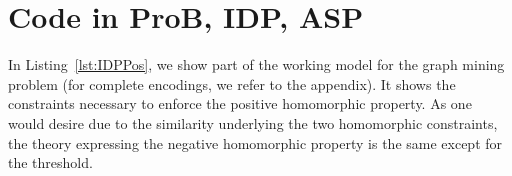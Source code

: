 \section{Code in ProB, IDP, ASP}\label{sec:code}
\pagebreak

In Listing~\ref{lst:IDPPos}, we show part of the working model for the graph mining problem (for complete encodings, we refer to the appendix).
It shows the constraints necessary to enforce the positive homomorphic property.
As one would desire due to the similarity underlying the two homomorphic constraints, the theory expressing the negative homomorphic property is the same except for the threshold.

